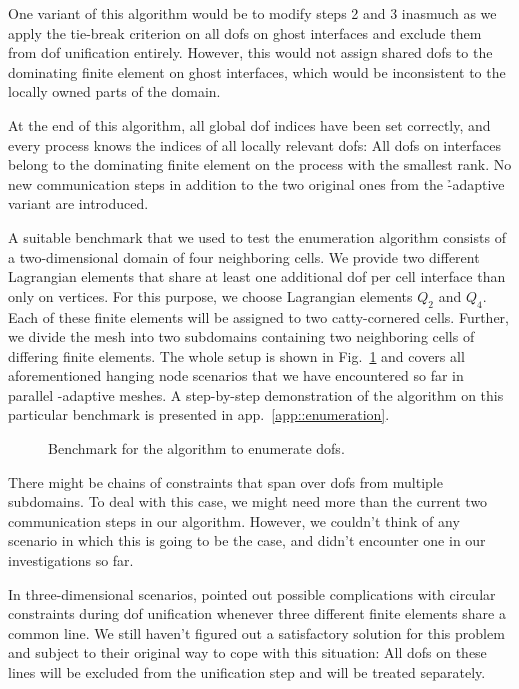 One variant of this algorithm would be to modify steps 2 and 3 inasmuch as we apply the tie-break criterion on all \glspl{dof} on ghost interfaces and exclude them from \gls{dof} unification entirely. However, this would not assign shared \glspl{dof} to the dominating finite element on ghost interfaces, which would be inconsistent to the locally owned parts of the domain.

At the end of this algorithm, all global \gls{dof} indices have been set correctly, and every process knows the indices of all locally relevant \glspl{dof}: All \glspl{dof} on interfaces belong to the dominating finite element on the process with the smallest rank. No new communication steps in addition to the two original ones from the \h-adaptive variant are introduced.

A suitable benchmark that we used to test the enumeration algorithm consists of a two-dimensional domain of four neighboring cells. We provide two different Lagrangian elements that share at least one additional \gls{dof} per cell interface than only on vertices. For this purpose, we choose Lagrangian elements $Q_2$ and $Q_4$. Each of these finite elements will be assigned to two catty-cornered cells. Further, we divide the mesh into two subdomains containing two neighboring cells of differing finite elements. The whole setup is shown in Fig.~\ref{fig:enumbenchmark} and covers all aforementioned hanging node scenarios that we have encountered so far in parallel \hp-adaptive meshes. A step-by-step demonstration of the algorithm on this particular benchmark is presented in app.~\ref{app::enumeration}.

\begin{figure}
\centering


\caption{Benchmark for the algorithm to enumerate \glspl{dof}.}
\label{fig:enumbenchmark}
\end{figure}

There might be chains of constraints that span over \glspl{dof} from multiple subdomains. To deal with this case, we might need more than the current two communication steps in our algorithm. However, we couldn't think of any scenario in which this is going to be the case, and didn't encounter one in our investigations so far.

In three-dimensional scenarios, \textcite[Sec.~4.6]{bangerth2009} pointed out possible complications with circular constraints during \gls{dof} unification whenever three different finite elements share a common line. We still haven't figured out a satisfactory solution for this problem and subject to their original way to cope with this situation: All \glspl{dof} on these lines will be excluded from the unification step and will be treated separately.